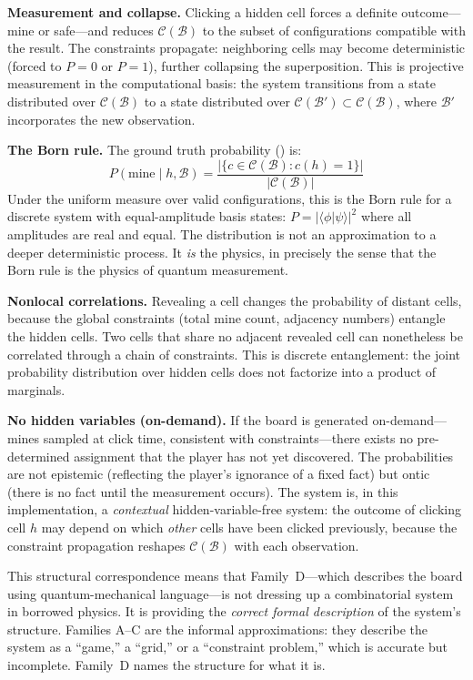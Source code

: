 \documentclass[12pt,a4paper]{article}
\begin{document}
\textbf{Measurement and collapse.} Clicking a hidden cell forces a definite outcome---mine or safe---and reduces $\mathcal{C}(\mathcal{B})$ to the subset of configurations compatible with the result. The constraints propagate: neighboring cells may become deterministic (forced to $P = 0$ or $P = 1$), further collapsing the superposition. This is projective measurement in the computational basis: the system transitions from a state distributed over $\mathcal{C}(\mathcal{B})$ to a state distributed over $\mathcal{C}(\mathcal{B}') \subset \mathcal{C}(\mathcal{B})$, where $\mathcal{B}'$ incorporates the new observation.

\textbf{The Born rule.} The ground truth probability () is:
\[
P(\text{mine} \mid h, \mathcal{B}) = \frac{|\{c \in \mathcal{C}(\mathcal{B}) : c(h) = 1\}|}{|\mathcal{C}(\mathcal{B})|}
\]
Under the uniform measure over valid configurations, this is the Born rule for a discrete system with equal-amplitude basis states: $P = |\langle \phi | \psi \rangle|^2$ where all amplitudes are real and equal. The distribution is not an approximation to a deeper deterministic process. It \emph{is} the physics, in precisely the sense that the Born rule is the physics of quantum measurement.

\textbf{Nonlocal correlations.} Revealing a cell changes the probability of distant cells, because the global constraints (total mine count, adjacency numbers) entangle the hidden cells. Two cells that share no adjacent revealed cell can nonetheless be correlated through a chain of constraints. This is discrete entanglement: the joint probability distribution over hidden cells does not factorize into a product of marginals.

\textbf{No hidden variables (on-demand).} If the board is generated on-demand---mines sampled at click time, consistent with constraints---there exists no pre-determined assignment that the player has not yet discovered. The probabilities are not epistemic (reflecting the player's ignorance of a fixed fact) but ontic (there is no fact until the measurement occurs). The system is, in this implementation, a \emph{contextual} hidden-variable-free system: the outcome of clicking cell $h$ may depend on which \emph{other} cells have been clicked previously, because the constraint propagation reshapes $\mathcal{C}(\mathcal{B})$ with each observation.

\medskip

This structural correspondence means that Family~D---which describes the board using quantum-mechanical language---is not dressing up a combinatorial system in borrowed physics. It is providing the \emph{correct formal description} of the system's structure. Families A--C are the informal approximations: they describe the system as a ``game,'' a ``grid,'' or a ``constraint problem,'' which is accurate but incomplete. Family~D names the structure for what it is.
\end{document}
